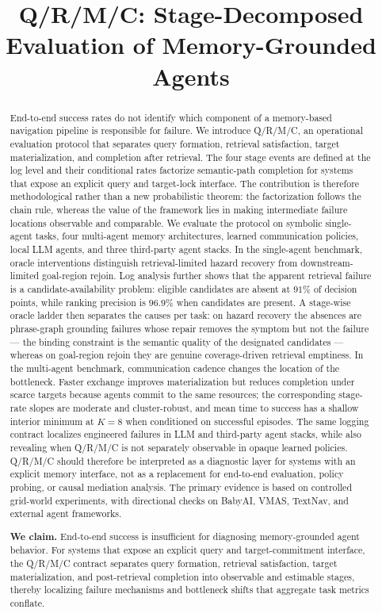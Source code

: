 \documentclass{article}
\title{Q/R/M/C: Stage-Decomposed Evaluation of Memory-Grounded Agents}
\begin{document}
\maketitle
\begin{abstract}
End-to-end success rates do not identify which component of a
memory-based navigation pipeline is responsible for failure. We
introduce Q/R/M/C, an operational evaluation protocol that separates
query formation, retrieval satisfaction, target materialization, and
completion after retrieval. The four stage events are defined at the
log level and their conditional rates factorize semantic-path
completion for systems that expose an explicit query and target-lock
interface. The contribution is therefore methodological rather than a
new probabilistic theorem: the factorization follows the chain rule,
whereas the value of the framework lies in making intermediate
failure locations observable and comparable. We evaluate the protocol
on symbolic single-agent tasks, four multi-agent memory
architectures, learned communication policies, local LLM agents, and
three third-party agent stacks. In the single-agent benchmark, oracle
interventions distinguish retrieval-limited hazard recovery from
downstream-limited goal-region rejoin. Log analysis further shows that
the apparent retrieval failure is a candidate-availability
problem: eligible candidates are absent at $91\%$ of decision points,
while ranking precision is $96.9\%$ when candidates are present. A
stage-wise oracle ladder then separates the causes per task: on
hazard recovery the absences are phrase-graph grounding failures
whose repair removes the symptom but not the failure --- the binding
constraint is the semantic quality of the designated candidates ---
whereas on goal-region rejoin they are genuine coverage-driven
retrieval emptiness. In
the multi-agent benchmark, communication cadence changes the location
of the bottleneck. Faster exchange improves materialization but
reduces completion under scarce targets because agents commit to the
same resources; the corresponding stage-rate slopes are moderate and
cluster-robust, and mean time to success has a shallow interior
minimum at $K=8$ when conditioned on successful episodes. The same
logging contract localizes engineered failures in LLM and third-party
agent stacks, while also revealing when Q/R/M/C is not separately
observable in opaque learned policies. Q/R/M/C should therefore be
interpreted as a diagnostic layer for systems with an explicit memory
interface, not as a replacement for end-to-end evaluation, policy
probing, or causal mediation analysis. The primary evidence is based
on controlled grid-world experiments, with directional checks on
BabyAI, VMAS, TextNav, and external agent frameworks.
\par\medskip\noindent\textbf{We claim.} End-to-end success is
insufficient for diagnosing memory-grounded agent behavior. For systems
that expose an explicit query and target-commitment interface, the
Q/R/M/C contract separates query formation, retrieval satisfaction,
target materialization, and post-retrieval completion into observable
and estimable stages, thereby localizing failure mechanisms and
bottleneck shifts that aggregate task metrics conflate.
\end{abstract}
\end{document}
